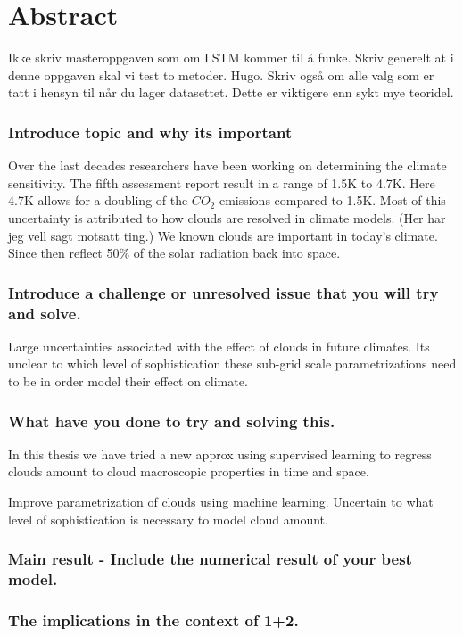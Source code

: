 \chapter*{Abstract}
Ikke skriv masteroppgaven som om LSTM kommer til å funke. Skriv generelt at i denne oppgaven skal vi test to metoder. Hugo. 
Skriv også om alle valg som er tatt i hensyn til når du lager datasettet. Dette er viktigere enn sykt mye teoridel. 


\subsection*{Introduce topic and why its important}
Over the last decades researchers have been working on determining the climate sensitivity. The fifth assessment report result in a range of 1.5K to 4.7K. Here 4.7K allows for a doubling of the $CO_2$ emissions compared to 1.5K. Most of this uncertainty is attributed to how clouds are resolved in climate models. (Her har jeg vell sagt motsatt ting.) We known clouds are important in today's climate. Since then reflect 50\% of the solar radiation back into space. %

\subsection*{Introduce a challenge or unresolved issue that you will try and solve.} 

Large uncertainties associated with the effect of clouds in future climates. Its unclear to which level of sophistication these sub-grid scale parametrizations need to be in order model their effect on climate.


\subsection*{What have you done to try and solving this.}
In this thesis we have tried a new approx using supervised learning to regress clouds amount to cloud macroscopic properties in time and space. 

Improve parametrization of clouds using machine learning. Uncertain to what level of sophistication is necessary to model cloud amount. 

\subsection*{Main result - Include the numerical result of your best model.}

\subsection*{The implications in the context of 1+2.}
\cleardoublepage